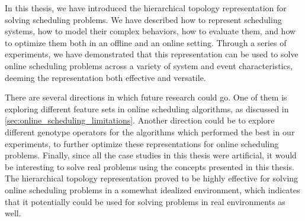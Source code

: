 In this thesis, we have introduced the hierarchical topology representation for solving scheduling problems. We have described how to represent scheduling systems, how to model their complex behaviors, how to evaluate them, and how to optimize them both in an offline and an online setting. Through a series of experiments, we have demonstrated that this representation can be used to solve online scheduling problems across a variety of system and event characteristics, deeming the representation both effective and versatile.

There are several directions in which future research could go. One of them is exploring different feature sets in online scheduling algorithms, as discussed in \ref{sec:online_scheduling_limitations}. Another direction could be to explore different genotype operators for the algorithms which performed the best in our experiments, to further optimize these representations for online scheduling problems. Finally, since all the case studies in this thesis were artificial, it would be interesting to solve real problems using the concepts presented in this thesis. The hierarchical topology representation proved to be highly effective for solving online scheduling problems in a somewhat idealized environment, which indicates that it potentially could be used for solving problems in real environments as well.
